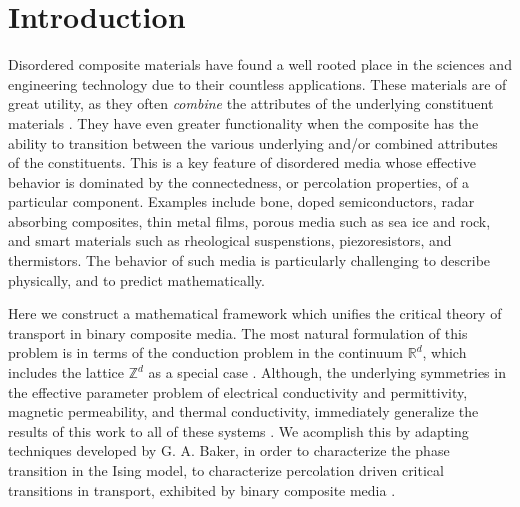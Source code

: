\documentclass[english,12pt,jmp,graphicx]{revtex4-1}
\begin{document}

\maketitle %

%
\section{Introduction}\label{sec:Introduction}
%
Disordered composite materials have found a well rooted place in the
sciences and engineering technology due to their countless
applications. These materials are of great utility, as they often
\emph{combine} the attributes of the underlying constituent materials
\cite{MILTON:2002:TC}. They have even greater functionality when the
composite has the ability to transition between the various underlying
and/or combined attributes of the constituents. This is a key feature
of disordered media whose effective behavior is dominated by the
connectedness, or percolation properties, of a particular
component. Examples include bone, doped semiconductors, radar
absorbing composites, thin metal films, porous media such as sea ice
and rock, and smart materials such as rheological suspenstions,
piezoresistors, and thermistors. The behavior of such media is
particularly  challenging to describe physically, and to predict
mathematically. 

Here we construct a mathematical framework which unifies the critical
theory of transport in binary composite media. The most natural
formulation of this problem is in terms of the conduction problem in
the continuum $\mathbb{R}^d$, which includes the lattice
$\mathbb{Z}^d$ as a special case
\cite{Golden:JMP-5627,Golden:CMP-473}. Although, the underlying
symmetries in the effective parameter problem of electrical
conductivity and permittivity, magnetic permeability, and thermal
conductivity, immediately generalize the results of this work to
all of these systems \cite{MILTON:2002:TC}. We acomplish this by
adapting techniques developed by G. A. Baker, in order to characterize
the phase transition in the Ising model, to characterize percolation
driven critical transitions in transport, exhibited by binary
composite media \cite{Baker-1990}.  
\end{document}
